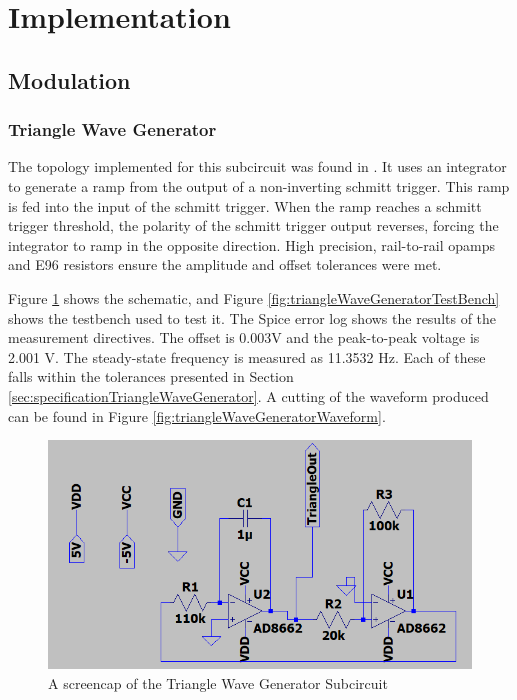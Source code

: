 \section{Implementation}
\label{sec:implementation}

\subsection{Modulation}
\subsubsection{Triangle Wave Generator}
\label{sec:implementationTriangleWaveGenerator}
The topology implemented for this subcircuit was found in \cite{TriangleWaveTopology}. 
It uses an integrator to generate a ramp from the output of a non-inverting schmitt trigger. 
This ramp is fed into the input of the schmitt trigger. When the ramp reaches a schmitt trigger threshold, the polarity of the schmitt trigger output reverses, forcing the integrator to ramp in the opposite direction. 
High precision, rail-to-rail opamps and E96 resistors ensure the amplitude and offset tolerances were met. 

Figure \ref{fig:triangleWaveGeneratorSchematic} shows the schematic, and Figure \ref{fig:triangleWaveGeneratorTestBench} shows the testbench used to test it. 
The Spice error log shows the results of the measurement directives.
The offset is 0.003V and the peak-to-peak voltage is 2.001 V.
The steady-state frequency is measured as 11.3532 Hz.
Each of these falls within the tolerances presented in Section \ref{sec:specificationTriangleWaveGenerator}.
A cutting of the waveform produced can be found in Figure \ref{fig:triangleWaveGeneratorWaveform}. 


\begin{figure}[H]
    \centering 
    \includegraphics[width=\textwidth]{../Circuits/Images/TriangleWaveGenerator/schematic}
    \caption{A screencap of the Triangle Wave Generator Subcircuit}
    \label{fig:triangleWaveGeneratorSchematic}
\end{figure}


